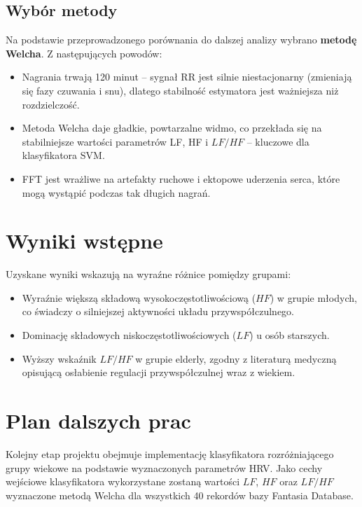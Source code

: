 \documentclass[a4paper,12pt]{article}
\begin{document}
\subsection{Wybór metody}

Na podstawie przeprowadzonego porównania do dalszej analizy wybrano \textbf{metodę Welcha}. Z następujących powodów:

\begin{itemize}
    \item Nagrania trwają 120 minut -- sygnał RR jest silnie niestacjonarny (zmieniają się fazy czuwania i snu), dlatego stabilność estymatora jest ważniejsza niż rozdzielczość.
    \item Metoda Welcha daje gładkie, powtarzalne widmo, co przekłada się na stabilniejsze wartości parametrów LF, HF i $LF/HF$ -- kluczowe dla klasyfikatora SVM.
    \item FFT jest wrażliwe  na artefakty ruchowe i ektopowe uderzenia serca, które mogą wystąpić podczas tak długich nagrań.
\end{itemize}


\section{Wyniki wstępne}

Uzyskane wyniki wskazują na wyraźne różnice pomiędzy grupami:

\begin{itemize}
    \item Wyraźnie większą składową wysokoczęstotliwościową ($HF$) w grupie młodych, co świadczy o silniejszej aktywności układu przywspółczulnego.
    \item Dominację składowych niskoczęstotliwościowych ($LF$) u osób starszych.
    \item Wyższy wskaźnik $LF/HF$ w grupie elderly, zgodny z literaturą medyczną opisującą osłabienie regulacji przywspółczulnej wraz z wiekiem.
\end{itemize}


\section{Plan dalszych prac}

Kolejny etap projektu obejmuje implementację klasyfikatora rozróżniającego grupy wiekowe na podstawie wyznaczonych parametrów HRV. Jako cechy wejściowe klasyfikatora wykorzystane zostaną wartości $LF$, $HF$ oraz $LF/HF$ wyznaczone metodą Welcha dla wszystkich 40 rekordów bazy Fantasia Database.
\end{document}
